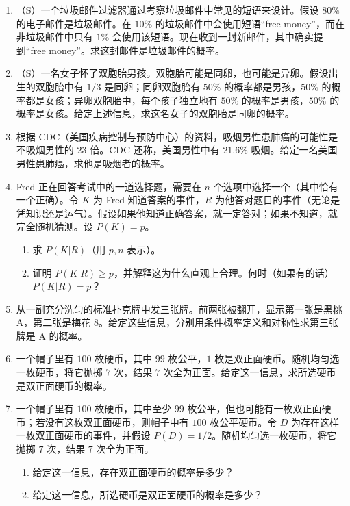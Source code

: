 \documentclass[UTF8,12pt,a4paper,fontset=fandol]{ctexart}
\begin{document}
\begin{enumerate}
  \item （S）一个垃圾邮件过滤器通过考察垃圾邮件中常见的短语来设计。假设 $80\%$ 的电子邮件是垃圾邮件。在 $10\%$ 的垃圾邮件中会使用短语“free money”，而在非垃圾邮件中只有 $1\%$ 会使用该短语。现在收到一封新邮件，其中确实提到“free money”。求这封邮件是垃圾邮件的概率。

  \item （S）一名女子怀了双胞胎男孩。双胞胎可能是同卵，也可能是异卵。假设出生的双胞胎中有 $1/3$ 是同卵；同卵双胞胎有 $50\%$ 的概率都是男孩，$50\%$ 的概率都是女孩；异卵双胞胎中，每个孩子独立地有 $50\%$ 的概率是男孩，$50\%$ 的概率是女孩。给定上述信息，求这名女子的双胞胎是同卵的概率。

  \item 根据 CDC（美国疾病控制与预防中心）的资料，吸烟男性患肺癌的可能性是不吸烟男性的 $23$ 倍。CDC 还称，美国男性中有 $21.6\%$ 吸烟。给定一名美国男性患肺癌，求他是吸烟者的概率。

  \item Fred 正在回答考试中的一道选择题，需要在 $n$ 个选项中选择一个（其中恰有一个正确）。令 $K$ 为 Fred 知道答案的事件，$R$ 为他答对题目的事件（无论是凭知识还是运气）。假设如果他知道正确答案，就一定答对；如果不知道，就完全随机猜测。设 $P(K)=p$。
  \begin{enumerate}
    \item 求 $P(K|R)$（用 $p,n$ 表示）。
    \item 证明 $P(K|R)\ge p$，并解释这为什么直观上合理。何时（如果有的话）$P(K|R)=p$？
  \end{enumerate}

  \item 从一副充分洗匀的标准扑克牌中发三张牌。前两张被翻开，显示第一张是黑桃 A，第二张是梅花 8。给定这些信息，分别用条件概率定义和对称性求第三张牌是 A 的概率。

  \item 一个帽子里有 $100$ 枚硬币，其中 $99$ 枚公平，$1$ 枚是双正面硬币。随机均匀选一枚硬币，将它抛掷 $7$ 次，结果 $7$ 次全为正面。给定这一信息，求所选硬币是双正面硬币的概率。

  \item 一个帽子里有 $100$ 枚硬币，其中至少 $99$ 枚公平，但也可能有一枚双正面硬币；若没有这枚双正面硬币，则帽子中有 $100$ 枚公平硬币。令 $D$ 为存在这样一枚双正面硬币的事件，并假设 $P(D)=1/2$。随机均匀选一枚硬币，将它抛掷 $7$ 次，结果 $7$ 次全为正面。
  \begin{enumerate}
    \item 给定这一信息，存在双正面硬币的概率是多少？
    \item 给定这一信息，所选硬币是双正面硬币的概率是多少？
  \end{enumerate}


\end{enumerate}
\end{document}
